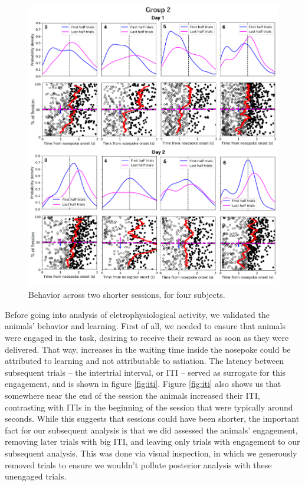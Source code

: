 \begin{figure}
    \centering
    \includegraphics[width=\textwidth]{figures/grupo2.png}
    \caption[Behavior across two sessions]{Behavior across two shorter sessions, for four subjects.}
    \label{fig:behavior2}
\end{figure} 

Before going into analysis of eletrophysiological activity, we validated the animals' behavior and learning. First of all, we needed to ensure that animals were engaged in the task, desiring to receive their reward as soon as they were delivered. That way, increases in the waiting time inside the nosepoke could be attributed to learning and not attributable to satiation. The latency between subsequent trials -- the intertrial interval, or ITI --  served as surrogate for this engagement, and is shown in figure \ref{fig:iti}. 
Figure \ref{fig:iti} also shows us that somewhere near the end of the session the animals increased their ITI, contrasting with ITIs in the beginning of the session that were typically around seconds. While this suggests that sessions could have been shorter, the important fact for our subsequent analysis is that we did assessed the animals' engagement, removing later trials with big ITI, and leaving only trials with engagement to our subsequent analysis. This was done via visual inspection, in which we generously removed trials to ensure we wouldn't pollute posterior analysis with these unengaged trials.

